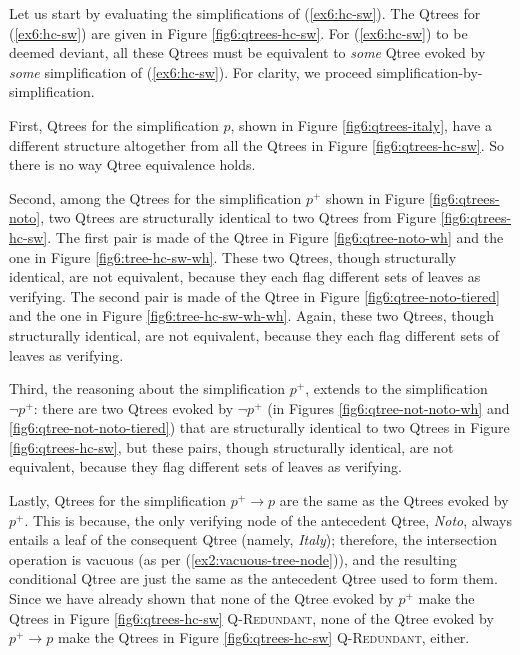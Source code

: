 Let us start by evaluating the simplifications of (\ref{ex6:hc-sw}). The Qtrees for (\ref{ex6:hc-sw}) are given in Figure \ref{fig6:qtrees-hc-sw}. For (\ref{ex6:hc-sw}) to be deemed deviant, all these Qtrees must be equivalent to \textit{some} Qtree evoked by \textit{some} simplification of (\ref{ex6:hc-sw}). For clarity, we proceed simplification-by-simplification.

First, Qtrees for the simplification $p$, shown in Figure \ref{fig6:qtrees-italy}, have a different structure altogether from all the Qtrees in Figure \ref{fig6:qtrees-hc-sw}. So there is no way Qtree equivalence holds.

Second, among the Qtrees for the simplification $p^+$ shown in Figure \ref{fig6:qtrees-noto}, two Qtrees are structurally identical to two Qtrees from Figure \ref{fig6:qtrees-hc-sw}. The first pair is made of the Qtree in Figure \ref{fig6:qtree-noto-wh} and the one in Figure \ref{fig6:tree-hc-sw-wh}. These two Qtrees, though structurally identical, are not equivalent, because they each flag different sets of leaves as verifying. The second pair is made of the Qtree in Figure \ref{fig6:qtree-noto-tiered} and the one in Figure \ref{fig6:tree-hc-sw-wh-wh}. Again, these two Qtrees, though structurally identical, are not equivalent, because they each flag different sets of leaves as verifying.

Third, the reasoning about the simplification $p^+$, extends to the simplification $\neg p^+$: there are two Qtrees evoked by $\neg p^+$ (in Figures \ref{fig6:qtree-not-noto-wh} and \ref{fig6:qtree-not-noto-tiered}) that are structurally identical to two Qtrees in Figure \ref{fig6:qtrees-hc-sw}, but these pairs, though structurally identical, are not equivalent, because they flag different sets of leaves as verifying.

Lastly, Qtrees for the simplification $p^+\rightarrow p$ are the same as the Qtrees evoked by $p^+$. This is because, the only verifying node of the antecedent Qtree, \textit{Noto}, always entails a leaf of the consequent Qtree (namely, \textit{Italy}); therefore, the intersection operation is vacuous (as per (\ref{ex2:vacuous-tree-node})), and the resulting conditional Qtree are just the same as the antecedent Qtree used to form them. Since we have already shown that none of the Qtree evoked by $p^+$ make the Qtrees in Figure \ref{fig6:qtrees-hc-sw} \textsc{Q-Redundant}, none of the Qtree evoked by $p^+\rightarrow p$ make the Qtrees in Figure \ref{fig6:qtrees-hc-sw} \textsc{Q-Redundant}, either.

